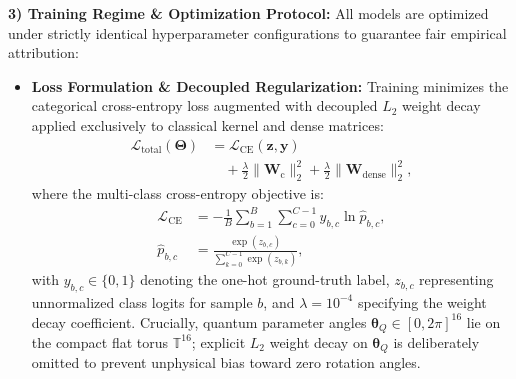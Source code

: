 \documentclass[journal]{IEEEtran}
\begin{document}
\textbf{3) Training Regime \& Optimization Protocol:}
All models are optimized under strictly identical hyperparameter configurations to guarantee fair empirical attribution:
\begin{itemize}
    \item \textbf{Loss Formulation \& Decoupled Regularization:} Training minimizes the categorical cross-entropy loss augmented with decoupled $L_2$ weight decay applied exclusively to classical kernel and dense matrices:
    \begin{align}
    \mathcal{L}_{\mathrm{total}}(\boldsymbol{\Theta}) &= \mathcal{L}_{\mathrm{CE}}(\mathbf{z}, \mathbf{y}) \nonumber \\
    &\quad + \frac{\lambda}{2} \|\mathbf{W}_{\mathrm{c}}\|_2^2 + \frac{\lambda}{2} \|\mathbf{W}_{\mathrm{dense}}\|_2^2,
    \label{eq:total_regularized_loss}
    \end{align}
    where the multi-class cross-entropy objective is:
    \begin{align}
    \mathcal{L}_{\mathrm{CE}} &= -\frac{1}{B} \sum_{b=1}^{B} \sum_{c=0}^{C-1} y_{b,c} \ln \hat{p}_{b,c}, \nonumber \\
    \hat{p}_{b,c} &= \frac{\exp(z_{b,c})}{\sum_{k=0}^{C-1} \exp(z_{b,k})},
    \label{eq:cross_entropy_exp2}
    \end{align}
    with $y_{b,c} \in \{0, 1\}$ denoting the one-hot ground-truth label, $z_{b,c}$ representing unnormalized class logits for sample $b$, and $\lambda = 10^{-4}$ specifying the weight decay coefficient. Crucially, quantum parameter angles $\boldsymbol{\theta}_Q \in [0, 2\pi]^{16}$ lie on the compact flat torus $\mathbb{T}^{16}$; explicit $L_2$ weight decay on $\boldsymbol{\theta}_Q$ is deliberately omitted to prevent unphysical bias toward zero rotation angles.


\end{itemize}
\end{document}
